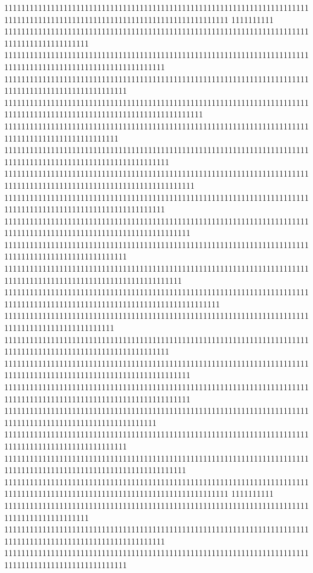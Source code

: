 11111111111111111111111111111111111111111111111111111111111111111111111111111111111111111111111111111111111111111111111111111
1111111111
11111111111111111111111111111111111111111111111111111111111111111111111111111111111111111111
11111111111111111111111111111111111111111111111111111111111111111111111111111111111111111111111111111111111111
11111111111111111111111111111111111111111111111111111111111111111111111111111111111111111111111111111
11111111111111111111111111111111111111111111111111111111111111111111111111111111111111111111111111111111111111111111111
111111111111111111111111111111111111111111111111111111111111111111111111111111111111111111111111111
111111111111111111111111111111111111111111111111111111111111111111111111111111111111111111111111111111111111111
111111111111111111111111111111111111111111111111111111111111111111111111111111111111111111111111111111111111111111111
11111111111111111111111111111111111111111111111111111111111111111111111111111111111111111111111111111111111111
11111111111111111111111111111111111111111111111111111111111111111111111111111111111111111111111111111111111111111111
11111111111111111111111111111111111111111111111111111111111111111111111111111111111111111111111111111
111111111111111111111111111111111111111111111111111111111111111111111111111111111111111111111111111111111111111111
111111111111111111111111111111111111111111111111111111111111111111111111111111111111111111111111111111111111111111111111111
11111111111111111111111111111111111111111111111111111111111111111111111111111111111111111111111111
111111111111111111111111111111111111111111111111111111111111111111111111111111111111111111111111111111111111111
11111111111111111111111111111111111111111111111111111111111111111111111111111111111111111111111111111111111111111111
11111111111111111111111111111111111111111111111111111111111111111111111111111111111111111111111111111111111111111111
111111111111111111111111111111111111111111111111111111111111111111111111111111111111111111111111111111111111
11111111111111111111111111111111111111111111111111111111111111111111111111111111111111111111111111111
1111111111111111111111111111111111111111111111111111111111111111111111111111111111111111111111111111111111111111111
11111111111111111111111111111111111111111111111111111111111111111111111111111111111111111111111111111111111111111111111111111
1111111111
11111111111111111111111111111111111111111111111111111111111111111111111111111111111111111111
11111111111111111111111111111111111111111111111111111111111111111111111111111111111111111111111111111111111111
11111111111111111111111111111111111111111111111111111111111111111111111111111111111111111111111111111
